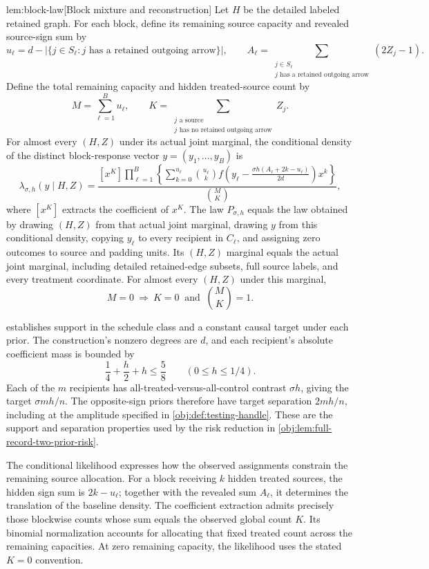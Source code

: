 \begin{lemmav}{lem:block-law}[Block mixture and reconstruction]
Let \(H\) be the detailed labeled retained graph. For each block, define its remaining source capacity and revealed source-sign sum by
\[
u_\ell=d-\bigl|\{j\in S_\ell:j\text{ has a retained outgoing arrow}\}\bigr|,
\qquad
A_\ell=\sum_{\substack{j\in S_\ell\\j\text{ has a retained outgoing arrow}}}(2Z_j-1).
\]
Define the total remaining capacity and hidden treated-source count by
\[
M=\sum_{\ell=1}^B u_\ell,
\qquad
K=\sum_{\substack{j\text{ a source}\\j\text{ has no retained outgoing arrow}}}Z_j.
\]
For almost every \((H,Z)\) under its actual joint marginal, the conditional density of the distinct block-response vector \(y=(y_1,\ldots,y_B)\) is
\[
\lambda_{\sigma,h}(y\mid H,Z)
=
\frac{
[x^K]\displaystyle\prod_{\ell=1}^B
\left\{
\sum_{k=0}^{u_\ell}
\binom{u_\ell}{k}
f\!\left(y_\ell-\frac{\sigma h(A_\ell+2k-u_\ell)}{2d}\right)x^k
\right\}
}{
\binom{M}{K}
},
\]
where \([x^K]\) extracts the coefficient of \(x^K\). The law \(P_{\sigma,h}\) equals the law obtained by drawing \((H,Z)\) from that actual joint marginal, drawing \(y\) from this conditional density, copying \(y_\ell\) to every recipient in \(C_\ell\), and assigning zero outcomes to source and padding units. Its \((H,Z)\) marginal equals the actual joint marginal, including detailed retained-edge subsets, full source labels, and every treatment coordinate. For almost every \((H,Z)\) under this marginal,
\[
M=0\ \Longrightarrow\ K=0\ \text{ and }\ \binom{M}{K}=1.
\]
\end{lemmav}

 establishes support in the schedule class and a constant causal target under each prior. The construction's nonzero degrees are \(d\), and each recipient's absolute coefficient mass is bounded by
\[
\frac14+\frac h2+h\le\frac58
\qquad(0\le h\le1/4).
\]
Each of the \(m\) recipients has all-treated-versus-all-control contrast \(\sigma h\), giving the target \(\sigma mh/n\). The opposite-sign priors therefore have target separation \(2mh/n\), including at the amplitude specified in \cref{obj:def:testing-handle}. These are the support and separation properties used by the risk reduction in \cref{obj:lem:full-record-two-prior-risk}.

The conditional likelihood expresses how the observed assignments constrain the remaining source allocation. For a block receiving \(k\) hidden treated sources, the hidden sign sum is \(2k-u_\ell\); together with the revealed sum \(A_\ell\), it determines the translation of the baseline density. The coefficient extraction admits precisely those blockwise counts whose sum equals the observed global count \(K\). Its binomial normalization accounts for allocating that fixed treated count across the remaining capacities. At zero remaining capacity, the likelihood uses the stated \(K=0\) convention.


